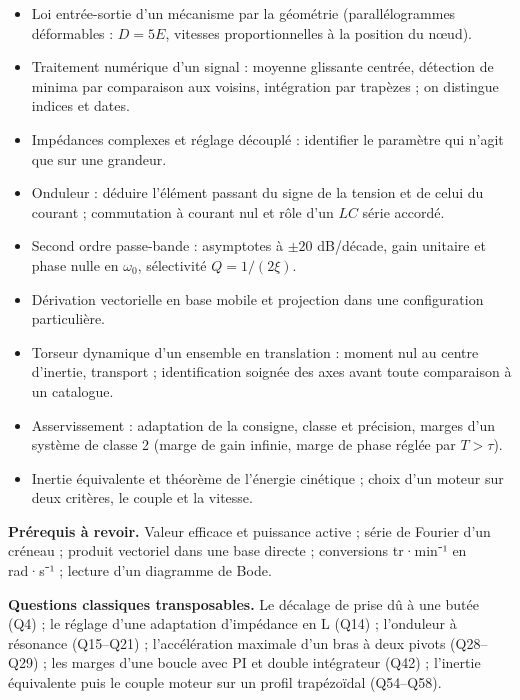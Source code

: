 \documentclass[11pt,a4paper]{article}
\providecommand{\tightlist}{\setlength{\itemsep}{0pt}\setlength{\parskip}{0pt}}
\begin{document}
\begin{itemize}
\tightlist
\item
  Loi entrée-sortie d'un mécanisme par la géométrie (parallélogrammes déformables : \(D=5E\), vitesses proportionnelles à la position du nœud).
\item
  Traitement numérique d'un signal : moyenne glissante centrée, détection de minima par comparaison aux voisins, intégration par trapèzes ; on distingue indices et dates.
\item
  Impédances complexes et réglage découplé : identifier le paramètre qui n'agit que sur une grandeur.
\item
  Onduleur : déduire l'élément passant du signe de la tension et de celui du courant ; commutation à courant nul et rôle d'un \(LC\) série accordé.
\item
  Second ordre passe-bande : asymptotes à \(\pm20\) dB/décade, gain unitaire et phase nulle en \(\omega_0\), sélectivité \(Q=1/(2\xi)\).
\item
  Dérivation vectorielle en base mobile et projection dans une configuration particulière.
\item
  Torseur dynamique d'un ensemble en translation : moment nul au centre d'inertie, transport ; identification soignée des axes avant toute comparaison à un catalogue.
\item
  Asservissement : adaptation de la consigne, classe et précision, marges d'un système de classe 2 (marge de gain infinie, marge de phase réglée par \(T>\tau\)).
\item
  Inertie équivalente et théorème de l'énergie cinétique ; choix d'un moteur sur deux critères, le couple et la vitesse.
\end{itemize}

\textbf{Prérequis à revoir.} Valeur efficace et puissance active ; série de Fourier d'un créneau ; produit vectoriel dans une base directe ; conversions tr·min⁻¹ en rad·s⁻¹ ; lecture d'un diagramme de Bode.

\textbf{Questions classiques transposables.} Le décalage de prise dû à une butée (Q4) ; le réglage d'une adaptation d'impédance en L (Q14) ; l'onduleur à résonance (Q15--Q21) ; l'accélération maximale d'un bras à deux pivots (Q28--Q29) ; les marges d'une boucle avec PI et double intégrateur (Q42) ; l'inertie équivalente puis le couple moteur sur un profil trapézoïdal (Q54--Q58).
\end{document}

